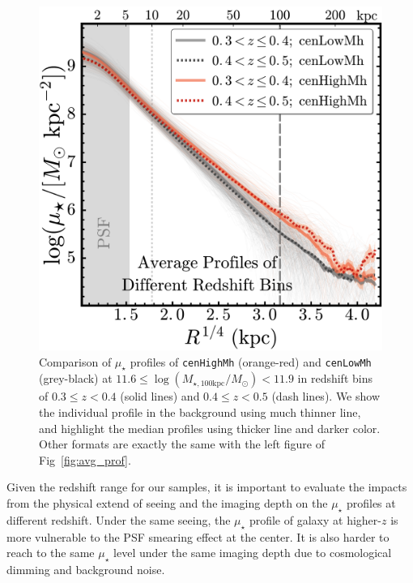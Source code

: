 \documentclass{emulateapj}
\def\rbcg{\texttt{cenHighMh}}
\def\nbcg{\texttt{cenLowMh}}
\def\logmtot{{$\log (M_{\star,100\mathrm{kpc}}/M_{\odot})$}}
\def\mden{{$\mu_{\star}$}}
\begin{document}
\begin{CJK*}{UTF8}{gbsn}
\begin{figure}[tb!]
    \centering 
    \includegraphics[width=13.0cm]{fig/redbcg_avg_prof_z}
    \caption{
        Comparison of \mden{} profiles of \rbcg{} (orange-red) and \nbcg{} 
        (grey-black) at $11.6 \le$\logmtot$< 11.9$ in redshift bins of 
        $0.3\leq z<0.4$ (solid lines) and $0.4\leq z<0.5$ (dash lines). 
        We show the individual profile in the background using much thinner line, 
        and highlight the median profiles using thicker line and darker color.
        Other formats are exactly the same with the left figure of 
        Fig~\ref{fig:avg_prof}.}
    \label{fig:avg_prof_z}
\end{figure}    
    
    Given the redshift range for our samples, it is important to evaluate 
    the impacts from the physical extend of seeing and the imaging depth on the \mden{} 
    profiles at different redshift. 
    Under the same seeing, the \mden{} profile of galaxy at higher-$z$ is more 
    vulnerable to the PSF smearing effect at the center. 
    It is also harder to reach to the same \mden{} level under the same imaging depth 
    due to cosmological dimming and background noise. 
    

\end{CJK*}
\end{document}
